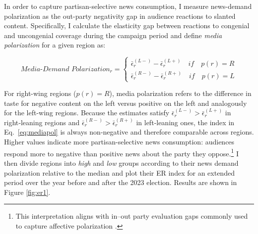 \documentclass[12pt]{article}
\begin{document}
	
In order to capture partisan-selective news consumption, I measure  news-demand polarization as the out-party negativity gap in audience reactions to slanted content. Specifically, I calculate the elasticity gap between reactions to congenial and uncongenial coverage during the campaign period and define \textit{media polarization} for a given region as: 
	
	
	\begin{equation}
		\textit{Media-Demand Polarization}_r  =	\begin{cases}
			\bar{\epsilon}_r^{(L-)}- \bar{\epsilon}_r^{(L+)} \quad if \quad p(r)=R\\
			\bar{\epsilon}_r^{(R-)}- \bar{\epsilon}_r^{(R+)} \quad if \quad p(r)=L
		\end{cases}
		\label{eq:mediapol}
	\end{equation}
	
	For right-wing regions ($p(r)=R$), media polarization refers to the difference in taste for negative content on the left versus positive on the left and analogously for the left-wing regions. Because the estimates satisfy
	\(\bar{\epsilon}_r^{(L-)}>\bar{\epsilon}_r^{(L+)}\) in right‑leaning regions and
	\(\bar{\epsilon}_r^{(R-)}>\bar{\epsilon}_r^{(R+)}\) in left‑leaning ones,
	the index in Eq.~\eqref{eq:mediapol} is always non‑negative and therefore comparable across regions. Higher values indicate more partisan-selective news consumption: audiences 	 respond more to negative than positive news about the party they oppose.\footnote{This interpretation aligns with in–out party evaluation gaps commonly used to capture affective polarization \citep{IyengarLelkesLevendusky2019Origins}.} I then divide regions into \textit{high} and \textit{low} groups according to their news demand polarization  relative to the median and plot their ER index for an extended period over the year before and after the 2023 election.  Results are shown in Figure \ref{fig:er1}.
	
	
	
\end{document}

